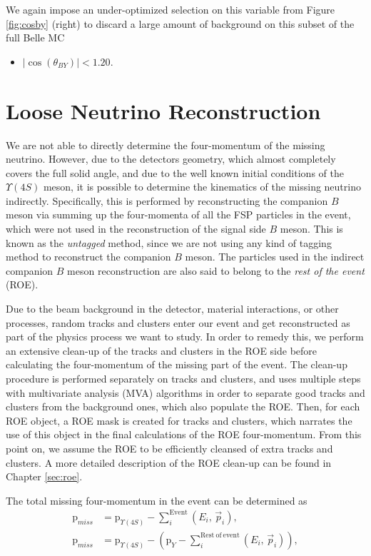 We again impose an under-optimized selection on this variable from Figure \ref{fig:cosby} (right) to discard a large amount of background on this subset of the full Belle MC
\begin{itemize}
	\item $\vert \cos \left(\theta_{BY}\right) \vert < 1.20$.
\end{itemize}

\section{Loose Neutrino Reconstruction}\label{sec:loose-neutrino-reconstruction}
We are not able to directly determine the four-momentum of the missing neutrino. However, due to the detectors geometry, which almost completely covers the full solid angle, and due to the well known initial conditions of the $\Upsilon(4S)$ meson, it is possible to determine the kinematics of the missing neutrino indirectly. Specifically, this is performed by reconstructing the companion $B$ meson via summing up the four-momenta of all the FSP particles in the event, which were not used in the reconstruction of the signal side $B$ meson. This is known as the \textit{untagged} method, since we are not using any kind of tagging method to reconstruct the companion $B$ meson. The particles used in the indirect companion $B$ meson reconstruction are also said to belong to the \textit{rest of the event} (ROE).

Due to the beam background in the detector, material interactions, or other processes, random tracks and clusters enter our event and get reconstructed as part of the physics process we want to study. In order to remedy this, we perform an extensive clean-up of the tracks and clusters in the ROE side before calculating the four-momentum of the missing part of the event. The clean-up procedure is performed separately on tracks and clusters, and uses multiple steps with multivariate analysis (MVA) algorithms in order to separate good tracks and clusters from the background ones, which also populate the ROE. Then, for each ROE object, a ROE mask is created for tracks and clusters, which narrates the use of this object in the final calculations of the ROE four-momentum. From this point on, we assume the ROE to be efficiently cleansed of extra tracks and clusters. A more detailed description of the ROE clean-up can be found in Chapter \ref{sec:roe}. 

The total missing four-momentum in the event can be determined as
\begin{align}
\mathrm{p}_{miss} &= \mathrm{p}_{\Upsilon(4S)} - \sum_i^{\mathrm{Event}}\left(E_i,\,\vec{p}_i \right),\\
\label{eq:ROEloop}
\mathrm{p}_{miss} &= \mathrm{p}_{\Upsilon(4S)} - \left(\mathrm{p}_{Y} -\sum_i^{\mathrm{Rest~of~event}}\left(E_i,\,\vec{p}_i \right)\right),
\end{align}

